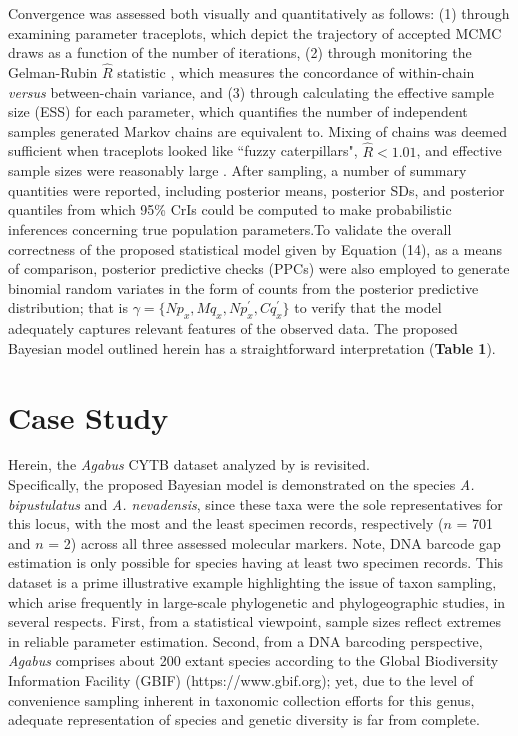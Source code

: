 \documentclass[12pt]{article}
\begin{document}
Convergence was assessed both visually and quantitatively as follows: (1) through \\ examining parameter traceplots, which depict the trajectory of accepted MCMC draws as a function of the number of iterations, (2) through monitoring the Gelman-Rubin $\hat{R}$ statistic \citep{gelman1992iterative, vehtari2017rank}, which measures the concordance of within-chain \textit{versus} between-chain variance, and (3) through calculating the effective sample size (ESS) for each parameter, which quantifies the number of independent samples generated Markov chains are equivalent to. Mixing of chains was deemed sufficient when traceplots looked like ``fuzzy caterpillars", $\hat{R} < 1.01$, and effective sample sizes were reasonably large \citep{gelman2020bayesian}.
After sampling, a number of summary quantities were reported, including posterior means, posterior SDs, and posterior quantiles from which 95\% CrIs could be computed to make probabilistic inferences concerning true population parameters.To validate the overall correctness of the proposed statistical model given by Equation (14), as a means of comparison, posterior predictive checks (PPCs) were also employed to generate binomial random variates in the form of counts from the posterior predictive distribution; that is $\gamma = \{Np_x, Mq_x, Np^{'}_x, Cq^{'}_x\}$ to verify that the model adequately captures relevant features of the observed data. The proposed Bayesian model outlined herein has a straightforward interpretation (\textbf{Table 1}). 

\section{Case Study}

Herein, the \textit{Agabus} CYTB dataset analyzed by \citet{phillips2024measure} is revisited. \\ Specifically, the proposed Bayesian model is demonstrated on the species \textit{A. bipustulatus} and \textit{A. nevadensis}, since these taxa were the sole representatives for this locus, with the most and the least specimen records, respectively ($n$ = 701 and $n$ = 2) across all three assessed molecular markers. Note, DNA barcode gap estimation is only possible for species having at least two specimen records. This dataset is a prime illustrative example highlighting the issue of taxon sampling, which arise frequently in large-scale phylogenetic and phylogeographic studies, in several respects. First, from a statistical viewpoint, sample sizes reflect extremes in reliable parameter estimation. Second, from a DNA barcoding perspective, \textit{Agabus} comprises about 200 extant species according to the Global Biodiversity Information Facility (GBIF) (https://www.gbif.org); yet, due to the level of convenience sampling inherent in taxonomic collection efforts for this genus, adequate representation of species and genetic diversity is far from complete. 
\end{document}
